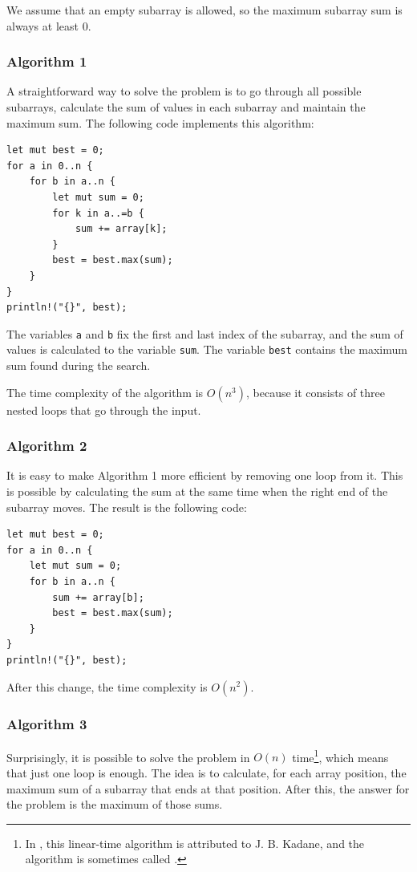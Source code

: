 We assume that an empty subarray is allowed,
so the maximum subarray sum is always at least $0$.

\subsubsection{Algorithm 1}

A straightforward way to solve the problem
is to go through all possible subarrays,
calculate the sum of values in each subarray and maintain
the maximum sum.
The following code implements this algorithm:

\begin{lstlisting}
let mut best = 0;
for a in 0..n {
    for b in a..n {
        let mut sum = 0;
        for k in a..=b {
            sum += array[k];
        }
        best = best.max(sum);
    }
}
println!("{}", best);
\end{lstlisting}

The variables \texttt{a} and \texttt{b} fix the first and
last index of the subarray,
and the sum of values is calculated to the variable \texttt{sum}.
The variable \texttt{best} contains the maximum sum found during the search.

The time complexity of the algorithm is $O(n^3)$,
because it consists of three nested loops 
that go through the input.

\subsubsection{Algorithm 2}

It is easy to make Algorithm 1 more efficient
by removing one loop from it.
This is possible by calculating the sum at the same
time when the right end of the subarray moves.
The result is the following code:

\begin{lstlisting}
let mut best = 0;
for a in 0..n {
    let mut sum = 0;
    for b in a..n {
        sum += array[b];
        best = best.max(sum);
    }
}
println!("{}", best);
\end{lstlisting}
After this change, the time complexity is $O(n^2)$.

\subsubsection{Algorithm 3}

Surprisingly, it is possible to solve the problem
in $O(n)$ time\footnote{In \cite{ben86}, this linear-time algorithm
is attributed to J. B. Kadane, and the algorithm is sometimes
called  .}, which means
that just one loop is enough.
The idea is to calculate, for each array position,
the maximum sum of a subarray that ends at that position.
After this, the answer for the problem is the
maximum of those sums.


